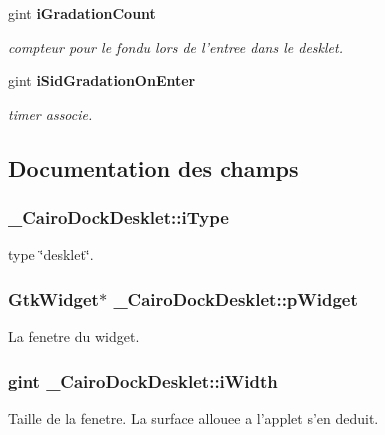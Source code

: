 \begin{CompactItemize}
gint {\bf iGradationCount}
\begin{CompactList}\small\item\em compteur pour le fondu lors de l'entree dans le desklet. \item\end{CompactList}\item 
gint {\bf iSidGradationOnEnter}
\begin{CompactList}\small\item\em timer associe. \item\end{CompactList}\end{CompactItemize}


\subsection{Documentation des champs}
\subsubsection{ {\bf \_\-CairoDockDesklet::iType}}\label{struct__CairoDockDesklet_692e2911a1cde18118b7536925f1cb15}


type \char`\"{}desklet\char`\"{}. 

\subsubsection{\setlength{\rightskip}{0pt plus 5cm}GtkWidget$\ast$ {\bf \_\-CairoDockDesklet::pWidget}}\label{struct__CairoDockDesklet_c3d0c33b6f8133aa63a6adf916c5e49a}


La fenetre du widget. 

\subsubsection{\setlength{\rightskip}{0pt plus 5cm}gint {\bf \_\-CairoDockDesklet::iWidth}}\label{struct__CairoDockDesklet_8f497ad22b091d6b00e60fae46563929}


Taille de la fenetre. La surface allouee a l'applet s'en deduit. 

